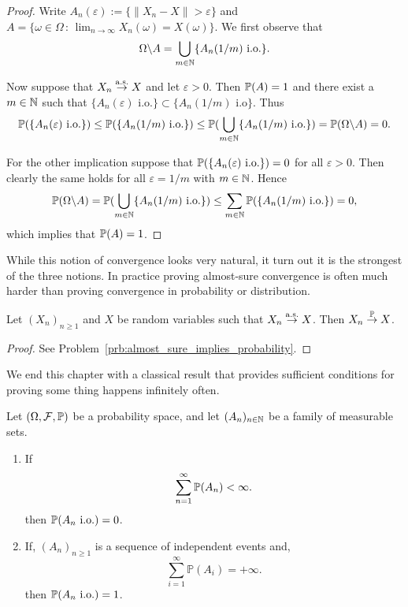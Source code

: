 \begin{proof}
Write $A_n(\varepsilon) :=  \{\|X_n - X\| > \varepsilon\}$ and $A = \{\omega \in \Omega \, : \, \lim_{n \to \infty} X_n(\omega) = X(\omega)\}$. We first observe that
\[
	\Omega\backslash A = \bigcup_{m \in \mathbb N} \{A_n(1/m) \text{ i.o.}\}.
\]

Now suppose that $X_n \stackrel{\mathrm{a.s.}}{\rightarrow} X$ and let $\varepsilon > 0$. Then $\mathbb P(A) = 1$ and there exist a $m \in \mathbb N$ such that $\{A_n(\varepsilon) \text{ i.o.}\} \subset \{A_n(1/m) \text{ i.o}\}$. Thus
\[
	\mathbb P(\{A_n(\varepsilon) \text{ i.o.}\}) \le \mathbb P(\{A_n(1/m) \text{ i.o.}\}) \le \mathbb P(\bigcup_{m \in \mathbb N} \{A_n(1/m) \text{ i.o.}\}) = \mathbb P(\Omega \backslash A) = 0.
\]

For the other implication suppose that $\mathbb P(\{A_n(\varepsilon) \text{ i.o.}\}) = 0$ for all $\varepsilon > 0$. Then clearly the same holds for all $\varepsilon = 1/m$ with $m \in \mathbb N$. Hence
\[
	\mathbb P(\Omega\backslash A) = \mathbb P(\bigcup_{m \in \mathbb N} \{A_n(1/m) \text{ i.o.}\}) \le \sum_{m \in \mathbb N} \mathbb P(\{A_n(1/m) \text{ i.o.}\}) = 0,
\]
which implies that $\mathbb P(A) = 1$.
\end{proof}

While this notion of convergence looks very natural, it turn out it is the strongest of the three notions. In practice proving almost-sure convergence is often much harder than proving convergence in probability or distribution.

\begin{lemma}\label{lem:almost_sure_implies_probability}
Let $(X_n)_{n \ge 1}$ and $X$ be random variables such that $X_n \stackrel{\mathrm{a.s.}}{\rightarrow} X$. Then $X_n \stackrel{\mathbb P}{\rightarrow} X$.
\end{lemma}

\begin{proof}
See Problem~\ref{prb:almost_sure_implies_probability}.
\end{proof}

We end this chapter with a classical result that provides sufficient conditions for proving some thing happens infinitely often.

\begin{lemma}\label{lem:borel_cantelli}
Let $(\Omega, \mathcal{F}, \mathbb P)$ be a probability space, and let $(A_n)_{n\in\mathbb N}$ be a family of measurable sets.
\begin{enumerate}[label={(\alph*)}]
\item If
\[
	\sum_{n=1}^\infty \mathbb P(A_n) < \infty.
\]
then $\mathbb P(A_n \text{ i.o.}) = 0$.
\item If, $(A_n)_{n \ge 1}$ is a sequence of independent events and,
\[
	\sum_{i=1}^\infty \mathbb{P}(A_i) = +\infty.
\]
then $\mathbb P(A_n \text{ i.o.}) = 1$.
\end{enumerate}
\end{lemma}

